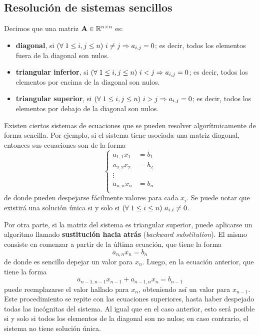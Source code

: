 \subsection{Resolución de sistemas sencillos}

Decimos que una matriz $\mathbf{A} \in \mathbb{R}^{n \times n}$ es:
\begin{itemize}[itemsep=0em]
\item \textbf{diagonal}, si $\left(\forall\;1 \leq i,j \leq n\right)\, i \neq j \Rightarrow a_{i,j} = 0$;
    es decir, todos los elementos fuera de la diagonal son nulos.
\item \textbf{triangular inferior}, si $\left(\forall\;1 \leq i,j \leq n\right)\, i < j \Rightarrow a_{i,j} = 0$;
    es decir, todos los elementos por encima de la diagonal son nulos.
\item \textbf{triangular superior}, si $\left(\forall\;1 \leq i,j \leq n\right)\, i > j \Rightarrow a_{i,j} = 0$;
    es decir, todos los elementos por debajo de la diagonal son nulos.
\end{itemize}

Existen ciertos sistemas de ecuaciones que se pueden resolver algorítmicamente
de forma sencilla. Por ejemplo, si el sistema tiene asociada una matriz
diagonal, entonces sus ecuaciones son de la forma
\[ \left\lbrace \begin{aligned}
    a_{1,1} x_1 &= b_1 \\
    a_{2,2} x_2 &= b_2 \\
    \vdots \\
    a_{n,n} x_n &= b_n \\
\end{aligned} \right. \]
de donde pueden despejarse fácilmente valores para cada $x_i$. Se puede notar
que existirá una solución única si y solo si $\left(\forall\;1 \leq i \leq n\right)\, a_{i,i}
\neq 0$.

Por otra parte, si la matriz del sistema es triangular superior, puede
aplicarse un algoritmo llamado \textbf{sustitución hacia atrás}
(\emph{backward substitution}). El mismo consiste en comenzar a partir de la
última ecuación, que tiene la forma
\[ a_{n,n} x_n = b_n \]
de donde es sencillo depejar un valor para $x_n$. Luego, en la ecuación
anterior, que tiene la forma
\[ a_{n-1,n-1} x_{n-1} + a_{n-1,n} x_n = b_{n-1} \]
puede reemplazarse el valor hallado para $x_n$, obteniendo así un valor para
$x_{n-1}$. Este procedimiento se repite con las ecuaciones superiores,
hasta haber despejado todas las incógnitas del sistema. Al igual que en el
caso anterior, esto será posible si y solo si todos los elementos de la
diagonal son no nulos; en caso contrario, el sistema no tiene solución única.

